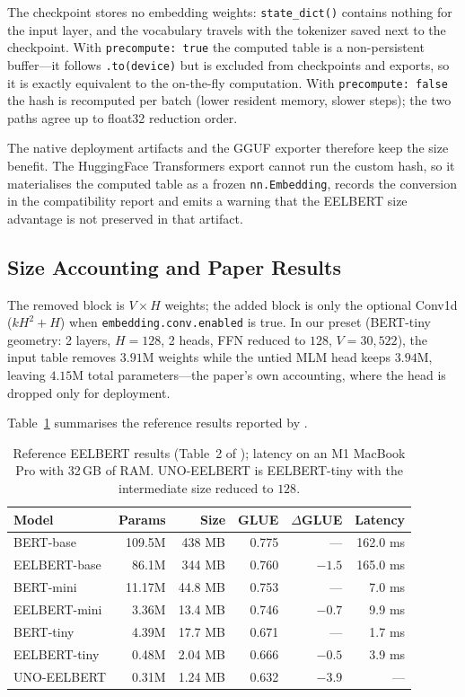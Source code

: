 The checkpoint stores no embedding weights: \texttt{state\_dict()} contains nothing for the input layer, and the vocabulary travels with the tokenizer saved next to the checkpoint. With \texttt{precompute: true} the computed table is a non-persistent buffer---it follows \texttt{.to(device)} but is excluded from checkpoints and exports, so it is exactly equivalent to the on-the-fly computation. With \texttt{precompute: false} the hash is recomputed per batch (lower resident memory, slower steps); the two paths agree up to float32 reduction order.

The native deployment artifacts and the GGUF exporter therefore keep the size benefit. The HuggingFace Transformers export cannot run the custom hash, so it materialises the computed table as a frozen \texttt{nn.Embedding}, records the conversion in the compatibility report and emits a warning that the EELBERT size advantage is not preserved in that artifact.

\subsection{Size Accounting and Paper Results}

The removed block is $V\times H$ weights; the added block is only the optional Conv1d ($k H^2 + H$) when \texttt{embedding.conv.enabled} is true. In our preset  (BERT-tiny geometry: 2 layers, $H=128$, 2 heads, FFN reduced to $128$, $V=30{,}522$), the input table removes $3.91$M weights while the untied MLM head keeps $3.94$M, leaving $4.15$M total parameters---the paper's own accounting, where the head is dropped only for deployment.

Table~\ref{tab:eelbert-results} summarises the reference results reported by \citet{cohn_eelbert_2023}.

\begin{table}[H]
\centering
\small
\begin{tabular}{@{}l r r r r r@{}}
\toprule
\textbf{Model} & \textbf{Params} & \textbf{Size} & \textbf{GLUE} & \textbf{$\Delta$GLUE} & \textbf{Latency} \\
\midrule
BERT-base & 109.5M & 438 MB & 0.775 & --- & 162.0 ms \\
EELBERT-base & 86.1M & 344 MB & 0.760 & $-1.5$ & 165.0 ms \\
BERT-mini & 11.17M & 44.8 MB & 0.753 & --- & 7.0 ms \\
EELBERT-mini & 3.36M & 13.4 MB & 0.746 & $-0.7$ & 9.9 ms \\
BERT-tiny & 4.39M & 17.7 MB & 0.671 & --- & 1.7 ms \\
EELBERT-tiny & 0.48M & 2.04 MB & 0.666 & $-0.5$ & 3.9 ms \\
UNO-EELBERT & 0.31M & 1.24 MB & 0.632 & $-3.9$ & --- \\
\bottomrule
\end{tabular}
\caption{Reference EELBERT results (Table~2 of \citealp{cohn_eelbert_2023}); latency on an M1 MacBook Pro with 32\,GB of RAM. UNO-EELBERT is EELBERT-tiny with the intermediate size reduced to $128$.}
\label{tab:eelbert-results}
\end{table}

